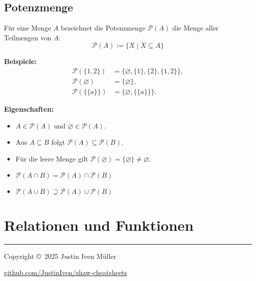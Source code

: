 \documentclass[10pt,landscape]{article}
\begin{document}
\begin{multicols*}{4}
\subsection{Potenzmenge}
Für eine Menge \(A\) bezeichnet die Potenzmenge \( \mathcal{P}(A) \) die Menge aller Teilmengen von \(A\):
\[
\mathcal{P}(A):=\{X \mid X\subseteq A\}
\]

\textbf{Beispiele:}
\begin{align*}
\mathcal{P}(\{1,2\}) &= \{\varnothing,\{1\},\{2\},\{1,2\}\},\\
\mathcal{P}(\varnothing) &= \{\varnothing\},\\
\mathcal{P}(\{\{a\}\}) &= \{\varnothing,\{\{a\}\}\}.
\end{align*}

\textbf{Eigenschaften:}
\begin{itemize}
  \item \(A\in\mathcal{P}(A)\) und \(\varnothing\in\mathcal{P}(A)\).
  \item Aus \(A\subseteq B\) folgt \(\mathcal{P}(A)\subseteq\mathcal{P}(B)\).
  \item Für die leere Menge gilt \(\mathcal{P}(\varnothing)=\{\varnothing\}\neq\varnothing\).
  \item \(\mathcal{P}(A\cap B)=\mathcal{P}(A)\cap\mathcal{P}(B)\)
  \item \(\mathcal{P}(A\cup B)\supseteq \mathcal{P}(A)\cup\mathcal{P}(B)\)
\end{itemize}

\section{Relationen und Funktionen}




% 

\vfill

\rule{0.3\linewidth}{0.25pt}
\scriptsize

Copyright \copyright\ 2025 Justin Iven Müller

\href{https://github.com/JustinIven/zhaw-cheatsheets}{github.com/JustinIven/zhaw-cheatsheets}


\end{multicols*}
\end{document}
